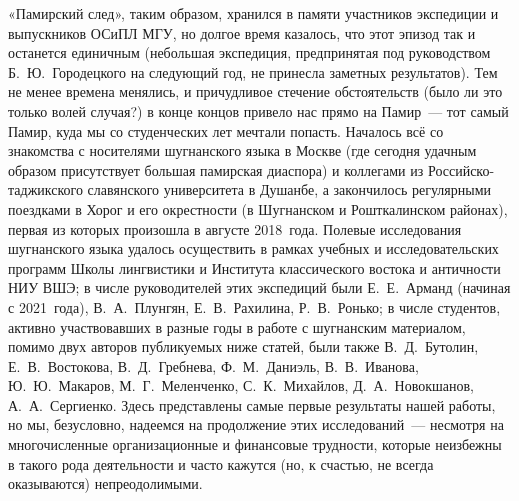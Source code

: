 «Памирский след», таким образом, хранился в памяти участников экспедиции и выпускников ОСиПЛ МГУ, но долгое время казалось, что этот эпизод так и останется единичным (небольшая экспедиция, предпринятая под руководством Б.~Ю.~Городецкого на следующий год, не принесла заметных результатов). Тем не менее времена менялись, и причудливое стечение обстоятельств (было ли это только волей случая?) в конце концов привело нас прямо на Памир~— тот самый Памир, куда мы со студенческих лет мечтали попасть. Началось всё со знакомства с носителями шугнанского языка в Москве (где сегодня удачным образом присутствует большая памирская диаспора) и коллегами из Российско-таджикского славянского университета в Душанбе, а закончилось регулярными поездками в Хорог и его окрестности (в Шугнанском и Рошткалинском районах), первая из которых произошла в августе 2018~года. Полевые исследования шугнанского языка удалось осуществить в рамках учебных и исследовательских программ Школы лингвистики и Института классического востока и античности НИУ ВШЭ; в числе руководителей этих экспедиций были Е.~Е.~Арманд (начиная с 2021~года), В.~А.~Плунгян, Е.~В.~Рахилина, Р.~В.~Ронько; в числе студентов, активно участвовавших в разные годы в работе с шугнанским материалом, помимо двух авторов публикуемых ниже статей, были также В.~Д.~Бутолин, Е.~В.~Востокова, В.~Д.~Гребнева, Ф.~М.~Даниэль, В.~В.~Иванова, Ю.~Ю.~Макаров, М.~Г.~Меленченко, С.~К.~Михайлов, Д.~А.~Новокшанов, А.~А.~Сергиенко. Здесь представлены самые первые результаты нашей работы, но мы, безусловно, надеемся на продолжение этих исследований~— несмотря на многочисленные организационные и финансовые трудности, которые неизбежны в такого рода деятельности и часто кажутся (но, к счастью, не всегда оказываются) непреодолимыми.

